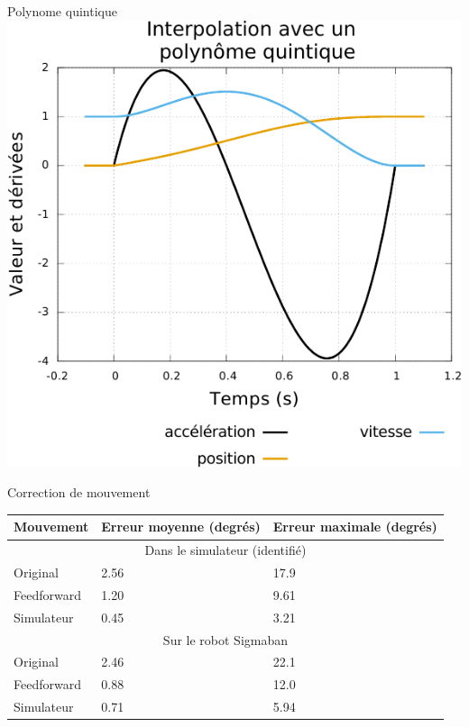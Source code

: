 \begin{frame}[noframenumbering]{Polynome quintique}
    \centering
    \includegraphics[type=pdf,ext=.pdf,read=.pdf,width=0.6\linewidth]{../plot/quintic_runge}
\end{frame}

\begin{frame}[noframenumbering]{Correction de mouvement}
    \centering
    \begin{tabular}{|l|l|l|}
        \hline
        Mouvement & Erreur moyenne (degrés) & Erreur maximale (degrés) \\
        \hline
        \multicolumn{3}{|c|}{Dans le simulateur (identifié)} \\
        \hline
        Original & 2.56 & 17.9 \\
        Feedforward & 1.20 & 9.61 \\
        Simulateur & 0.45 & 3.21 \\
        \hline
        \multicolumn{3}{|c|}{Sur le robot Sigmaban} \\
        \hline
        Original & 2.46 & 22.1 \\
        Feedforward & 0.88 & 12.0 \\
        Simulateur & 0.71 & 5.94 \\
        \hline
    \end{tabular}
\end{frame}

